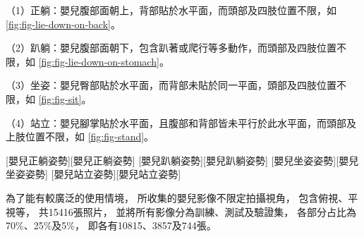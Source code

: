 \documentclass[class=NCU_thesis, crop=false]{standalone}
\begin{document}
（1）正躺：嬰兒腹部面朝上，背部貼於水平面，而頭部及四肢位置不限，如
\cref{fig:fig-lie-down-on-back}。

（2）趴躺：嬰兒腹部面朝下，包含趴著或爬行等多動作，而頭部及四肢位置不限，如
\cref{fig:fig-lie-down-on-stomach}。

（3）坐姿：嬰兒臀部貼於水平面，而背部未貼於同一平面，頭部及四肢位置不限，如
\cref{fig:fig-sit}。

（4）站立：嬰兒腳掌貼於水平面，且腹部和背部皆未平行於此水平面，而頭部及上肢位置不限，如
\cref{fig:fig-stand}。

[嬰兒正躺姿勢][嬰兒正躺姿勢]
[嬰兒趴躺姿勢][嬰兒趴躺姿勢]
[嬰兒坐姿姿勢][嬰兒坐姿姿勢]
[嬰兒站立姿勢][嬰兒站立姿勢]

為了能有較廣泛的使用情境，
所收集的嬰兒影像不限定拍攝視角，
包含俯視、平視等，
共15416張照片，
並將所有影像分為訓練、測試及驗證集，
各部分占比為70\%、25\%及5\%，
即各有10815、3857及744張。
\end{document}
